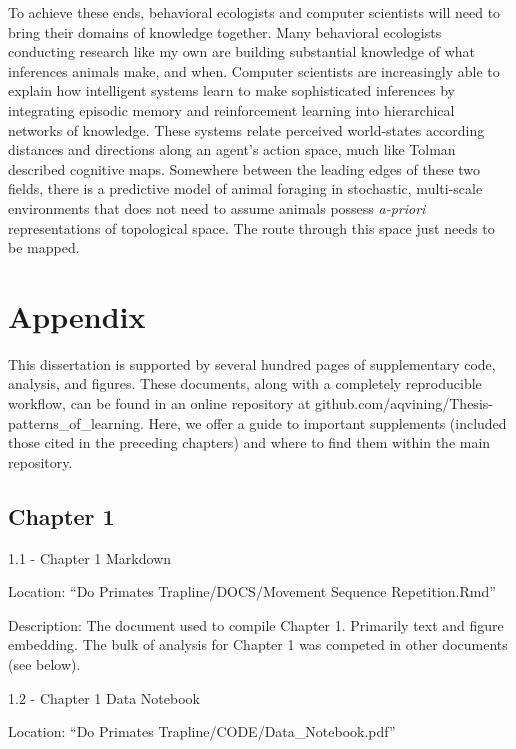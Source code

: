 \documentclass[twoside,12pt,final]{ucthesis-CA2012}
\begin{document}
\begin{ucmainmatter}
\begin{enumerate}
\end{enumerate}
To achieve these ends, behavioral ecologists and computer scientists will need to bring their domains of knowledge together. Many behavioral ecologists conducting research like my own are building substantial knowledge of what inferences animals make, and when. Computer scientists are increasingly able to explain how intelligent systems learn to make sophisticated inferences by integrating episodic memory and reinforcement learning into hierarchical networks of knowledge. These systems relate perceived world-states according distances and directions along an agent's action space, much like Tolman described cognitive maps. Somewhere between the leading edges of these two fields, there is a predictive model of animal foraging in stochastic, multi-scale environments that does not need to assume animals possess \emph{a-priori} representations of topological space. The route through this space just needs to be mapped.

\appendix

\hypertarget{appendix}{%
\chapter{Appendix}\label{appendix}}

This dissertation is supported by several hundred pages of supplementary code, analysis, and figures. These documents, along with a completely reproducible workflow, can be found in an online repository at github.com/aqvining/Thesis-patterns\_of\_learning. Here, we offer a guide to important supplements (included those cited in the preceding chapters) and where to find them within the main repository.

\hypertarget{chapter-1}{%
\section{Chapter 1}\label{chapter-1}}

1.1 - Chapter 1 Markdown

Location: ``Do Primates Trapline/DOCS/Movement Sequence Repetition.Rmd''

Description: The document used to compile Chapter 1. Primarily text and figure embedding. The bulk of analysis for Chapter 1 was competed in other documents (see below).

1.2 - Chapter 1 Data Notebook

Location: ``Do Primates Trapline/CODE/Data\_Notebook.pdf''


\end{ucmainmatter}
\end{document}
